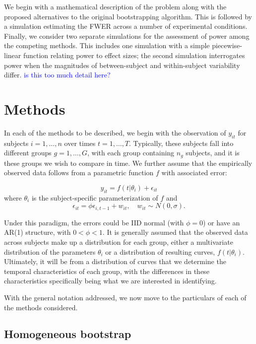 \documentclass{article}
\providecommand{\cn}[1]{\textcolor{blue}{#1}}
\begin{document}
We begin with a mathematical description of the problem along with the proposed alternatives to the original bootstrapping algorithm. This is followed by a simulation estimating the FWER across a number of experimental conditions. Finally, we consider two separate simulations for the assessment of power among the competing methods. This includes one simulation with a simple piecewise-linear function relating power to effect sizes; the second simulation interrogates power when the magnitudes of between-subject and within-subject variability differ. \cn{is this too much detail here?}




\section{Methods}

In each of the methods to be described, we begin with the observation of $y_{it}$ for subjects $i = 1, \dots, n$ over times $t = 1, \dots, T$. Typically, these subjects fall into different groups $g = 1, \dots, G$, with each group containing $n_g$ subjects, and it is these groups we wish to compare in time. We further assume that the empirically observed data follows from a parametric function $f$ with associated error:

\begin{equation}\label{eq:mean_structure}
y_{it} = f(t|\theta_i) + \epsilon_{it}
\end{equation}
where $\theta_i$ is the subject-specific parameterization of $f$ and 
\begin{equation}
\epsilon_{it} = \phi \epsilon_{i, t-1} + w_{it}, \quad w_{it} \sim N(0, \sigma).
\end{equation}

Under this paradigm, the errors could be IID normal (with $\phi = 0$) or have an AR(1) structure, with $0 < \phi < 1$. It is generally assumed that the observed data across subjects make up a distribution for each group, either a multivariate distribution of the parameters $\theta_i$ or a distribution of resulting curves, $f(t|\theta_i)$. Ultimately, it will be from a distribution of curves that we determine the temporal characteristics of each group, with the differences in these characteristics specifically being what we are interested in identifying.

With the general notation addressed, we now move to the particulars of each of the methods considered.

\subsection{Homogeneous bootstrap}
\end{document}
